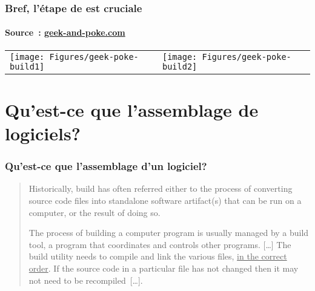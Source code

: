 \begin{frame}
\frametitle{Bref, l'\'etape de  est cruciale}
\framesubtitle{Source~: \url{geek-and-poke.com}}

\begin{tabular}{p{3in}p{2in}}
\hspace*{-1.3cm}\texttt{[image: Figures/geek-poke-build1]}
&
\hspace*{-1.8cm}\texttt{[image: Figures/geek-poke-build2]}
\end{tabular}



\NOTE{\ }

\end{frame}

\section{Qu'est-ce que l'assemblage de logiciels?}

\begin{frame}
\frametitle{Qu'est-ce que l'assemblage d'un logiciel?}

\begin{quote}
Historically, \alert{build} has often referred either to the process
of \alert{converting source code files into standalone software artifact(s)}
that can be run on a computer, or the result of doing so.

\bigskip

The process of building a computer program is usually managed by a
\alert{build tool}, a program that coordinates and controls other
programs. [\ldots] \alert{The build utility needs to compile and link the
various files, \underline{in the correct order}}. If the source code in a
particular file has not changed then it may not need to be
recompiled~[\ldots].
\end{quote}



\NOTE{\ }

\end{frame}

